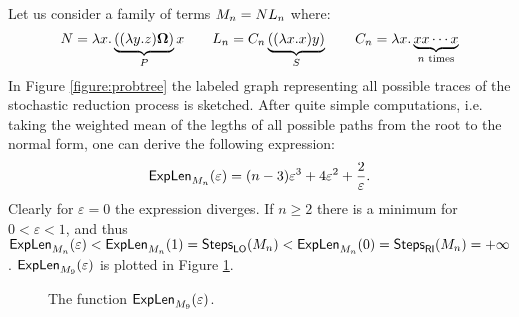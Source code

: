\begin{example}\label{example:nontr}
	Let us consider a family of terms $M_n=NL_n$ where:
	$$
	N = \lambda x.\underbrace{((\lambda y.z)\bm{\Omega})}_P x\qquad
	L_n = C_n\underbrace{((\lambda x.x)y)}_S\qquad
	C_n = \lambda  x.\underbrace{xx\cdots x}_{n\text{ times}}
	$$
	In Figure \ref{figure:probtree} the labeled graph representing all possible traces of the stochastic reduction process is sketched. After quite simple computations, i.e. taking the weighted mean of the legths of all possible paths from the root to the normal form, one can derive the following expression: 
	$$
	\textsf{ExpLen}_{M_n}(\varepsilon)=(n-3)\varepsilon^3+4\varepsilon^2+\frac{2}{\varepsilon}.
	$$
	Clearly for $\varepsilon=0$ the expression diverges. If $n\geq 2$ there is a minimum for $0<\varepsilon<1$, and thus $\textsf{ExpLen}_{M_n}(\varepsilon) <\textsf{ExpLen}_{M_n}(1)=\textsf{Steps}_{\textsf{LO}}(M_n) <\textsf{ExpLen}_{M_n}(0)= \textsf{Steps}_{\textsf{RI}}(M_n)=+\infty$. $\textsf{ExpLen}_{M_9}(\varepsilon)$ is plotted in Figure \ref{figure:plot}.
	\begin{figure}
		\caption{The function $\textsf{ExpLen}_{M_9}(\varepsilon)$.}
		\label{figure:plot}
	\end{figure}
\end{example}

